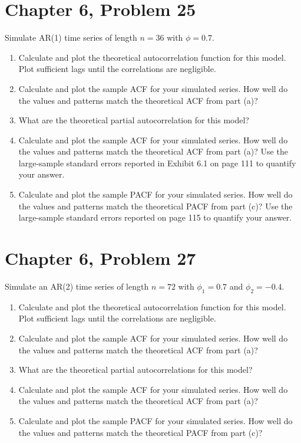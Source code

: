 \documentclass[11pt]{article}
\newif\ifclearpage
\newcommand{\problem}[1]{\section*{#1}}
\newcommand{\solution}{\hrulefill}
\newcommand{\maybeclearpage}{\ifclearpage\clearpage\fi}
\begin{document}
\problem{Chapter 6, Problem 25}
Simulate AR(1) time series of length $n=36$ with $\phi = 0.7$.
\begin{enumerate}
\item Calculate and plot the theoretical autocorrelation function for this model. Plot sufficient lags until the correlations are negligible.
\item Calculate and plot the sample ACF for your simulated series. How well do the values and patterns match the theoretical ACF from part (a)?
\item What are the theoretical partial autocorrelation for this model?
\item Calculate and plot the sample ACF for your simulated series. How well do the values and patterns match the theoretical ACF from part (a)? Use the large-sample standard errors reported in Exhibit 6.1 on page 111 to quantify your answer.
\item Calculate and plot the sample PACF for your simulated series. How well do the values and patterns match the theoretical PACF from part (c)? Use the large-sample standard errors reported on page 115 to quantify your answer.
\end{enumerate}

\solution


\maybeclearpage
\problem{Chapter 6, Problem 27}
Simulate an AR(2) time series of length $n=72$ with $\phi_1 = 0.7$ and $\phi_2 = -0.4$.
\begin{enumerate}
\item Calculate and plot the theoretical autocorrelation function for this model. Plot sufficient lags until the correlations are negligible.
\item Calculate and plot the sample ACF for your simulated series. How well do the values and patterns match the theoretical ACF from part (a)?
\item What are the theoretical partial autocorrelations for this model?
\item Calculate and plot the sample ACF for your simulated series. How well do the values and patterns match the theoretical ACF from part (a)?
\item Calculate and plot the sample PACF for your simulated series. How well do the values and patterns match the theoretical PACF from part (c)?
\end{enumerate}

\solution
\end{document}

